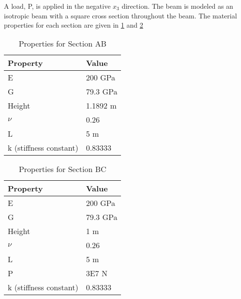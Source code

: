 \documentclass[letterpaper,12pt]{article}
\begin{document}

A load, P, is applied in the negative $x_3$ direction. The beam is modeled as an isotropic beam with a square cross section throughout the beam. The material properties for each section are given in \ref{tab:step} and \ref{tab:step1}

\begin{table}
\caption{\label{tab:step} Properties for Section AB}
\begin{center}
    \begin{tabular}{| l | l |}
    	\hline
    	Property               & Value              \\ \hline
    	E                      & 200 GPa   \\ \hline
    	G                      & 79.3 GPa \\ \hline
    	Height                      & 1.1892 m                \\ \hline
    	$\nu$                  & 0.26               \\ \hline
    	L                      & 5 m                 \\ \hline
    	k (stiffness constant) & 0.83333               \\ \hline
    \end{tabular}
\end{center}
\end{table}

\begin{table}
\caption{\label{tab:step1} Properties for Section BC}
\begin{center}
    \begin{tabular}{| l | l |}
    	\hline
    	Property               & Value              \\ \hline
    	E                      & 200 GPa   \\ \hline
    	G                      & 79.3 GPa \\ \hline
    	Height                      & 1 m                \\ \hline
    	$\nu$                  & 0.26               \\ \hline
    	L                      & 5 m                \\ \hline
    	P                  & 3E7 N                  \\ \hline
    	k (stiffness constant) & 0.83333               \\ \hline
    \end{tabular}
\end{center}
\end{table}
\end{document}
